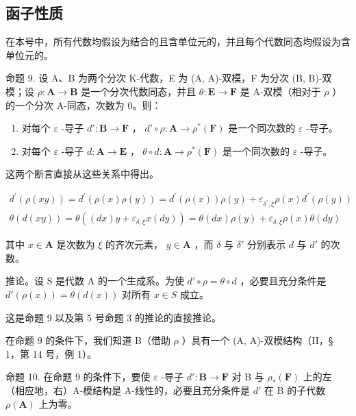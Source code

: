 \subsection{函子性质}

在本号中，所有代数均假设为结合的且含单位元的，并且每个代数同态均假设为含单位元的。

命题 9. 设 A、B 为两个分次 K-代数，E 为 (A, A)-双模，F 为分次 (B, B)-双模；设 \(\rho: \mathbf{A} \to \mathbf{B}\) 是一个分次代数同态，并且 \(\theta: \mathbf{E} \to \mathbf{F}\) 是 A-双模（相对于 \(\rho\) ）的一个分次 A-同态，次数为 0。则：

\begin{enumerate}
\def\labelenumi{(\roman{enumi})}
\item
  对每个 \(\varepsilon\) -导子 \(d':\mathbf{B}\to\mathbf{F}\) ， \(d'\circ\rho:\mathbf{A}\to\rho^{*}(\mathbf{F})\) 是一个同次数的 \(\varepsilon\) -导子。
\item
  对每个 \(\varepsilon\) -导子 \(d: \mathbf{A} \to \mathbf{E}\) ， \(\theta \circ d: \mathbf{A} \to \rho^{*}(\mathbf{F})\) 是一个同次数的 \(\varepsilon\) -导子。
\end{enumerate}

这两个断言直接从这些关系中得出。

\[
\begin{array}{l} d ^ {\prime} (\rho (x y)) = d ^ {\prime} (\rho (x) \rho (y)) = d ^ {\prime} (\rho (x)) \rho (y) + \varepsilon_ {\delta ^ {\prime}, \xi} \rho (x) d ^ {\prime} (\rho (y)) \\ \theta (d (x y)) = \theta ((d x) y + \varepsilon_ {\delta, \xi} x (d y)) = \theta (d x) \rho (y) + \varepsilon_ {\delta, \xi} \rho (x) \theta (d y) \end{array}
\]

其中 \(x \in \mathbf{A}\) 是次数为 \(\xi\) 的齐次元素， \(y \in \mathbf{A}\) ，而 \(\delta\) 与 \(\delta'\) 分别表示 \(d\) 与 \(d'\) 的次数。

推论。设 S 是代数 A 的一个生成系。为使 \(d' \circ \rho = \theta \circ d\) ，必要且充分条件是 \(d'(\rho(x)) = \theta(d(x))\) 对所有 \(x \in S\) 成立。

这是命题 9 以及第 5 号命题 3 的推论的直接推论。

在命题 9 的条件下，我们知道 B（借助 \(\rho\) ）具有一个 (A, A)-双模结构（II，§ 1，第 14 号，例 1）。

命题 10. 在命题 9 的条件下，要使 \(\varepsilon\) -导子 \(d': \mathbf{B} \to \mathbf{F}\) 对 B 与 \(\rho_*(\mathbf{F})\) 上的左（相应地，右）A-模结构是 A-线性的，必要且充分条件是 \(d'\) 在 B 的子代数 \(\rho(\mathbf{A})\) 上为零。

